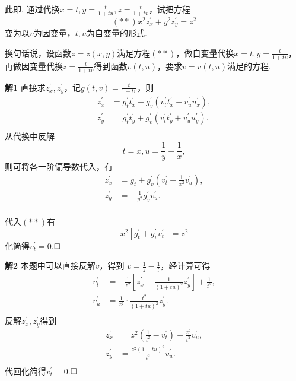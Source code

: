 \documentclass{ctexart}
\newenvironment{custom}[1]{\par\noindent \textbf{#1}\quad}{\par\vspace{1em}}
\begin{document}
\begin{example}
此即\cite[例题20.3.3]{XHM}. 通过代换$x=t,y=\frac{t}{1+tu},z=\frac{t}{1+tv}$，试把方程
$$(**)x^{2}z^{\prime}_{x}+y^{2}z^{\prime}_{y}=z^{2}$$
变为以$v$为因变量，$t,u$为自变量的形式.

换句话说，设函数$z=z(x,y)$满足方程$(**)$，做自变量代换$x=t,y=\frac{t}{1+tu}$，再做因变量代换$z=\frac{t}{1+tv}$得到函数$v(t,u)$，要求$v=v(t,u)$满足的方程.
\end{example}

\begin{custom}{解1}
直接求$z^{\prime}_{x},z^{\prime}_{y}$，记$g(t,v)=\frac{t}{1+tv}$，则
$$\begin{aligned}z^{\prime}_{x}&=g^{\prime}_{t}t^{\prime}_{x}+g^{\prime}_{v}(v^{\prime}_{t}t^{\prime}_{x}+v^{\prime}_{u}u^{\prime}_{x}),\\
z^{\prime}_{y}&=g^{\prime}_{t}t^{\prime}_{y}+g^{\prime}_{v}(v^{\prime}_{t}t^{\prime}_{y}+v^{\prime}_{u}u^{\prime}_{y}).\\\end{aligned}$$
从代换中反解
$$t=x,u=\frac{1}{y}-\frac{1}{x},$$
则可将各一阶偏导数代入，有
$$\begin{aligned}z^{\prime}_{x}&=g^{\prime}_{t}+g^{\prime}_{v}(v^{\prime}_{t}+\frac{1}{x^{2}}v^{\prime}_{u}),\\
z^{\prime}_{y}&=-\frac{1}{y^{2}}g^{\prime}_{v}v^{\prime}_{u}.\\\end{aligned}$$

代入$(**)$有
$$x^{2}\left[g^{\prime}_{t}+g^{\prime}_{v}v^{\prime}_{t}\right]=z^{2}$$
化简得$v^{\prime}_{t}=0$.$\hfill{\square}$
\end{custom}

\begin{custom}{解2}
本题中可以直接反解$v$，得到
$v=\frac{1}{z}-\frac{1}{t}$，经计算可得
$$\begin{aligned}v^{\prime}_{t}&=-\frac{1}{z^{2}}\left[z^{\prime}_{x}+\frac{1}{(1+tu)^{2}}z^{\prime}_{y}\right]+\frac{1}{t^{2}},\\
v^{\prime}_{u}&=\frac{1}{z^{2}}\cdot \frac{t^{2}}{(1+tu)^{2}}z^{\prime}_{y}.\\\end{aligned}$$
反解$z^{\prime}_{x},z^{\prime}_{y}$得到
$$\begin{aligned}
z^{\prime}_{x}&=z^{2}\left(\frac{1}{t^{2}}-v^{\prime}_{t}\right)-\frac{z^{2}}{t^{2}}v^{\prime}_{u},\\
z^{\prime}_{y}&=\frac{z^{2}(1+tu)^{2}}{t^{2}}v^{\prime}_{u}.
\\\end{aligned}$$
代回化简得$v^{\prime}_{t}=0$.$\hfill{\square}$
\end{custom}
\end{document}
